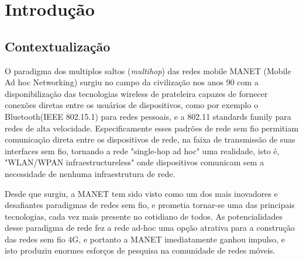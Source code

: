 \documentclass[12pt, %
openright, 
oneside, %
a4paper,    %
brazil]{facom-ufu-abntex2}
\begin{document}

\tableofcontents*
\cleardoublepage





\textual



\chapter{Introdução}
\section{Contextualização}
O paradigma dos multiplos saltos (\emph{multihop}) das redes mobile MANET (Mobile Ad hoc Networking) surgiu no campo da civilização nos anos 90 com a disponibilização das tecnologias wireless de prateleira capazes de fornecer conexões diretas entre os usuários de dispositivos, como por exemplo o Bluetooth(IEEE 802.15.1) para redes pessoais, e a 802.11 standards family para redes de alta velocidade. Especificamente esses padrões de rede sem fio permitiam comunicação direta entre os dispositivos de rede, na faixa de transmissão de suas interfaces sem fio, tornando a rede "single-hop ad hoc" uma realidade, isto é, "WLAN/WPAN infraestructureless" onde dispositivos comunicam sem a necessidade de nenhuma infraestrutura de rede.



Desde que surgiu, a MANET tem sido visto como um dos mais inovadores e desafiantes paradigmas de redes sem fio, e prometia tornar-se uma das principais tecnologias, cada vez mais presente no cotidiano de todos. As potencialidades desse paradigma de rede fez a rede ad-hoc uma opção atrativa para a construção das redes sem fio 4G, e portanto a MANET imediatamente ganhou impulso, e isto produziu enormes esforços de pesquisa na comunidade de redes móveis. 
\end{document}
